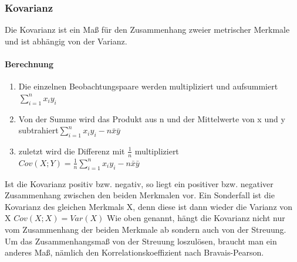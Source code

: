 \documentclass[a4paper]{article}
\begin{document}
\subsubsection{Kovarianz}
Die Kovarianz ist ein Maß für den Zusammenhang zweier metrischer Merkmale und ist abhängig von der Varianz.\\
\paragraph{Berechnung} 
\begin{enumerate}
    \item Die einzelnen Beobachtungspaare werden multipliziert und aufsummiert $\sum_{i=1}^nx_iy_i$
    \item Von der Summe wird das Produkt aus n und der Mittelwerte von x und y subtrahiert$\sum_{i=1}^nx_iy_i-n\bar{x}\bar{y}$
    \item zuletzt wird die Differenz mit $\frac{1}{n}$ multipliziert $Cov(X;Y)=\frac{1}{n}\sum_{i=1}^nx_iy_i-n\bar{x}\bar{y}$
\end{enumerate}
Ist die Kovarianz positiv bzw. negativ, so liegt ein positiver bzw. negativer Zusammenhang zwischen den beiden Merkmalen vor. Ein Sonderfall ist die Kovarianz des gleichen Merkmals X, denn diese ist dann wieder die Varianz von X $Cov(X;X)=Var(X)$
Wie oben genannt, hängt die Kovarianz nicht nur vom Zusammenhang der beiden Merkmale ab sondern auch von der Streuung. Um das Zusammenhangsmaß von der Streuung loszulösen, braucht man ein anderes Maß, nämlich den Korrelationskoeffizient nach Bravais-Pearson.
\end{document}
